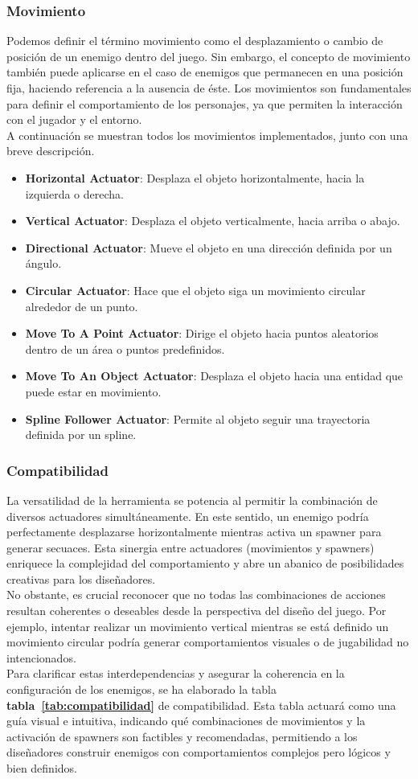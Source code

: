\subsubsection{Movimiento}
Podemos definir el término movimiento como el desplazamiento o cambio de posición de un enemigo dentro del juego. Sin embargo, el concepto de movimiento también puede aplicarse en el caso de enemigos que permanecen en una posición fija, haciendo referencia a la ausencia de éste. Los movimientos son fundamentales para definir el comportamiento de los personajes, ya que permiten la interacción con el jugador y el entorno.\\
A continuación se muestran todos los movimientos implementados, junto con una breve descripción.
\begin{itemize}
  \item \textbf{Horizontal Actuator}: Desplaza el objeto horizontalmente, hacia la izquierda o derecha.
    \item \textbf{Vertical Actuator}: Desplaza el objeto verticalmente, hacia arriba o abajo.
    \item \textbf{Directional Actuator}: Mueve el objeto en una dirección definida por un ángulo.
    \item \textbf{Circular Actuator}: Hace que el objeto siga un movimiento circular alrededor de un punto.
    \item \textbf{Move To A Point Actuator}: Dirige el objeto hacia puntos aleatorios dentro de un área o puntos predefinidos.
    \item \textbf{Move To An Object Actuator}: Desplaza el objeto hacia una entidad que puede estar en movimiento.
    \item \textbf{Spline Follower Actuator}: Permite al objeto seguir una trayectoria definida por un spline.
\end{itemize}
\subsubsection{Compatibilidad}
La versatilidad de la herramienta se potencia al permitir la combinación de diversos actuadores simultáneamente. En este sentido, un enemigo podría perfectamente desplazarse horizontalmente mientras activa un spawner para generar secuaces. Esta sinergia entre actuadores (movimientos y spawners) enriquece la complejidad del comportamiento y abre un abanico de posibilidades creativas para los diseñadores.\\
No obstante, es crucial reconocer que no todas las combinaciones de acciones resultan coherentes o deseables desde la perspectiva del diseño del juego. Por ejemplo, intentar realizar un movimiento vertical mientras se está definido un movimiento circular podría generar comportamientos visuales o de jugabilidad no intencionados. \\
Para clarificar estas interdependencias y asegurar la coherencia en la configuración de los enemigos, se ha elaborado la tabla \textbf{tabla~\ref{tab:compatibilidad}} de compatibilidad. Esta tabla actuará como una guía visual e intuitiva, indicando qué combinaciones de movimientos y la activación de spawners son factibles y recomendadas, permitiendo a los diseñadores construir enemigos con comportamientos complejos pero lógicos y bien definidos.

